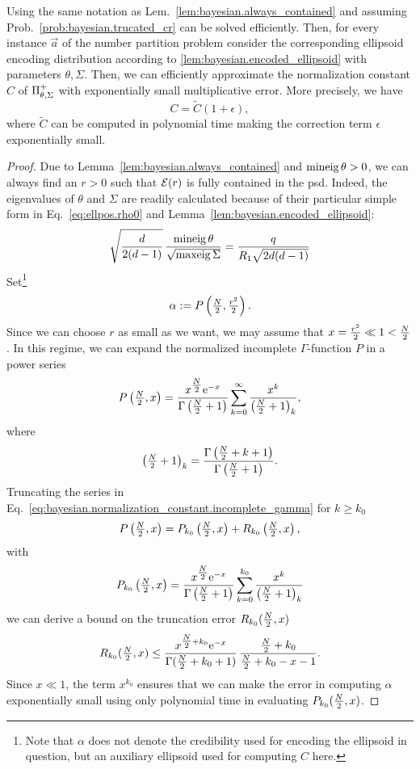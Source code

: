 \begin{lemma}\label{lem:bayesian.normalization_constant}
  Using the same notation as Lem.~\ref{lem:bayesian.always_contained} and assuming Prob.~\ref{prob:bayesian.trucated_cr} can be solved efficiently.
  Then, for every instance $\vec a$ of the number partition problem consider the corresponding ellipsoid encoding distribution according to \cref{lem:bayesian.encoded_ellipsoid} with parameters $\theta, \Sigma$.
  Then, we can efficiently approximate the normalization constant $C$ of $\Pi^+_{\theta,\Sigma}$ with exponentially small multiplicative error.
  More precisely, we have
  \[
    C = \tilde C (1 + \epsilon),
  \]
  where $\tilde C$ can be computed in polynomial time making the correction term $\epsilon$ exponentially small.
\end{lemma}
\begin{proof}
  Due to Lemma~\ref{lem:bayesian.always_contained} and $\operatorname{mineig}\theta > 0$, we can always find an $r > 0$ such that $\mathcal{E}(r)$ is fully contained in the psd.
  Indeed, the eigenvalues of $\theta$ and $\Sigma$ are readily calculated because of their particular simple form in Eq.~\eqref{eq:ellpos.rho0} and Lemma~\ref{lem:bayesian.encoded_ellipsoid}:
  \[
    \sqrt{\frac{d}{2(d-1)}} \, \frac{\operatorname{mineig}\theta}{\sqrt{\operatorname{maxeig}\Sigma}}
    =  \frac{q}{R_1 \sqrt{2d(d-1)}}
  \]
  Set\footnote{%
    Note that $\alpha$ does not denote the credibility used for encoding the ellipsoid in question, but an auxiliary ellipsoid used for computing $C$ here.
  }
  \[
    \alpha := P\left( \tfrac{N}{2}, \tfrac{r^2}{2} \right).
  \]
  Since we can choose $r$ as small as we want, we may assume that $x = \frac{r^2}{2} \ll 1 < \tfrac{N}{2}$.
  In this regime, we can expand the normalized incomplete $\Gamma$-function $P$ in a power series~\cite{Gil_2012_Efficient}
  \[
    \label{eq:bayesian.normalization_constant.incomplete_gamma}
    P\left( \tfrac{N}{2}, x \right) = \frac{x^{\tfrac{N}{2}} \mathrm{e}^{-x}}{\Gamma\left( \tfrac{N}{2} + 1 \right)} \sum_{k=0}^\infty \frac{x^k}{{\left( \tfrac{N}{2} + 1 \right)}_k},
  \]
  where
  \[
    {\left( \tfrac{N}{2} + 1 \right)}_k = \frac{\Gamma\left( \tfrac{N}{2} + k + 1 \right)}{\Gamma\left( \tfrac{N}{2} + 1 \right)}.
  \]
  Truncating the series in Eq.~\eqref{eq:bayesian.normalization_constant.incomplete_gamma} for $k \ge k_0$
  \[
    \label{eq:bayesian.normalization_constant.series}
    P\left( \tfrac{N}{2},x \right) = P_{k_0}\left( \tfrac{N}{2},x \right) + R_{k_0}\left( \tfrac{N}{2},x \right),
  \]
  with
  \[
    P_{k_0}\left( \tfrac{N}{2},x \right)
    = \frac{x^{\tfrac{N}{2}} \mathrm{e}^{-x}}{\Gamma\left( \tfrac{N}{2} + 1 \right)} \sum_{k=0}^{k_0} \frac{x^k}{{\left( \tfrac{N}{2} + 1 \right)}_k}
  \]
  we can derive a bound on the truncation error $R_{k_0}(\tfrac{N}{2},x)$~\cite[Eq.~(2.18)]{Gil_2012_Efficient}
  \[
    R_{k_0}(\tfrac{N}{2},x) \le \frac{x^{\tfrac{N}{2} + k_0} \mathrm{e}^{-x}}{\Gamma(\tfrac{N}{2} + k_0 + 1)}\, \frac{\tfrac{N}{2} + k_0}{\tfrac{N}{2} + k_0 - x - 1}.
  \]
  Since $x \ll 1$, the term $x^{k_0}$ ensures that we can make the error in computing $\alpha$ exponentially small using only polynomial time in evaluating $P_{k_0}(\tfrac{N}{2}, x)$.



\end{proof}
